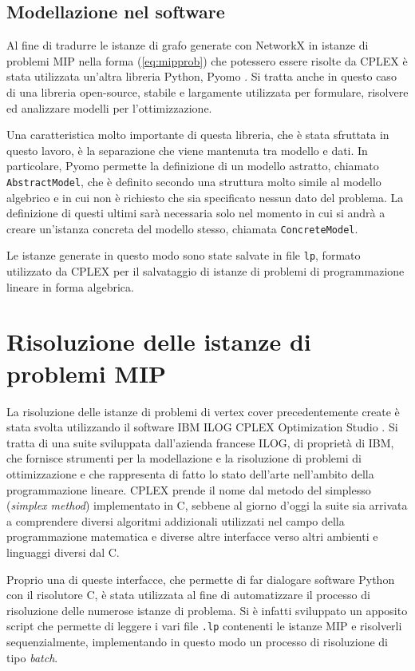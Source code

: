\subsection{Modellazione nel software}
Al fine di tradurre le istanze di grafo generate con NetworkX in istanze di problemi MIP nella forma (\ref{eq:mipprob}) che potessero essere risolte da CPLEX è stata utilizzata un'altra libreria Python, Pyomo \cite{bynum2021pyomo}\cite{hart2011pyomo}. Si tratta anche in questo caso di una libreria open-source, stabile e largamente utilizzata per formulare, risolvere ed analizzare modelli per l'ottimizzazione.

Una caratteristica molto importante di questa libreria, che è stata sfruttata in questo lavoro, è la separazione che viene mantenuta tra modello e dati.
In particolare, Pyomo permette la definizione di un modello astratto, chiamato \texttt{AbstractModel}, che è definito secondo una struttura molto simile al modello algebrico e in cui non è richiesto che sia specificato nessun dato del problema. La definizione di questi ultimi sarà necessaria solo nel momento in cui si andrà a creare un'istanza concreta del modello stesso, chiamata \texttt{ConcreteModel}.

Le istanze generate in questo modo sono state salvate in file \texttt{lp}, formato utilizzato da CPLEX per il salvataggio di istanze di problemi di programmazione lineare in forma algebrica. 



\section{Risoluzione delle istanze di problemi MIP}
La risoluzione delle istanze di problemi di vertex cover precedentemente create è stata svolta utilizzando il software IBM ILOG CPLEX Optimization Studio \cite{cplex}. Si tratta di una suite sviluppata dall'azienda francese ILOG, di proprietà di IBM, che fornisce strumenti per la modellazione e la risoluzione di problemi di ottimizzazione e che rappresenta di fatto lo stato dell'arte nell'ambito della programmazione lineare. CPLEX prende il nome dal metodo del simplesso (\textit{simplex method}) implementato in C, sebbene al giorno d'oggi la suite sia arrivata a comprendere diversi algoritmi addizionali utilizzati nel campo della programmazione matematica e diverse altre interfacce verso altri ambienti e linguaggi diversi dal C.  

Proprio una di queste interfacce,  che permette di far dialogare software Python con il risolutore C, è stata utilizzata al fine di automatizzare il processo di risoluzione delle numerose istanze di problema. Si è infatti sviluppato un apposito script che permette di leggere i vari file \texttt{.lp} contenenti le istanze MIP e risolverli sequenzialmente, implementando in questo modo un processo di risoluzione di tipo \textit{batch}. 

